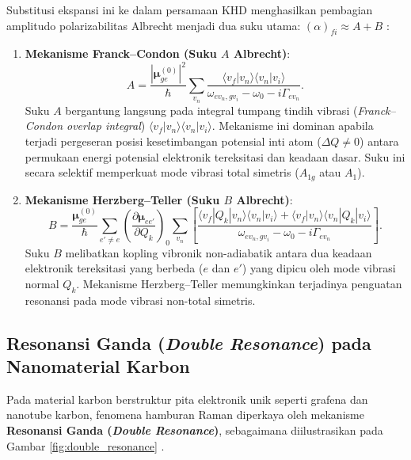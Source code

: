 Substitusi ekspansi ini ke dalam persamaan KHD menghasilkan pembagian amplitudo polarizabilitas Albrecht menjadi dua suku utama: $(\alpha)_{fi} \approx A + B$ \cite{albrecht1961theory}:
\begin{enumerate}
    \item \textbf{Mekanisme Franck--Condon (Suku $A$ Albrecht)}:
    \begin{equation}
    A = \frac{|\boldsymbol{\mu}_{ge}^{(0)}|^2}{\hbar} \sum_{v_n} \frac{\langle v_f | v_n \rangle \langle v_n | v_i \rangle}{\omega_{ev_n, gv_i} - \omega_0 - i\Gamma_{ev_n}}.
    \label{eq:albrecht_a}
    \end{equation}
    Suku $A$ bergantung langsung pada integral tumpang tindih vibrasi (\textit{Franck--Condon overlap integral}) $\langle v_f | v_n \rangle \langle v_n | v_i \rangle$. Mekanisme ini dominan apabila terjadi pergeseran posisi kesetimbangan potensial inti atom ($\Delta Q \neq 0$) antara permukaan energi potensial elektronik tereksitasi dan keadaan dasar. Suku ini secara selektif memperkuat mode vibrasi total simetris ($A_{1g}$ atau $A_1$).
    \item \textbf{Mekanisme Herzberg--Teller (Suku $B$ Albrecht)}:
    \begin{equation}
    B = \frac{\boldsymbol{\mu}_{ge}^{(0)}}{\hbar} \sum_{e' \neq e} \left( \frac{\partial \boldsymbol{\mu}_{ee'}}{\partial Q_k} \right)_0 \sum_{v_n} \left[ \frac{\langle v_f | Q_k | v_n \rangle \langle v_n | v_i \rangle + \langle v_f | v_n \rangle \langle v_n | Q_k | v_i \rangle}{\omega_{ev_n, gv_i} - \omega_0 - i\Gamma_{ev_n}} \right].
    \label{eq:albrecht_b}
    \end{equation}
    Suku $B$ melibatkan kopling vibronik non-adiabatik antara dua keadaan elektronik tereksitasi yang berbeda ($e$ dan $e'$) yang dipicu oleh mode vibrasi normal $Q_k$. Mekanisme Herzberg--Teller memungkinkan terjadinya penguatan resonansi pada mode vibrasi non-total simetris.
\end{enumerate}

\subsection{Resonansi Ganda (\textit{Double Resonance}) pada Nanomaterial Karbon}
Pada material karbon berstruktur pita elektronik unik seperti grafena dan nanotube karbon, fenomena hamburan Raman diperkaya oleh mekanisme \textbf{Resonansi Ganda (\textit{Double Resonance})}, sebagaimana diilustrasikan pada Gambar \ref{fig:double_resonance} \cite{ferrari2006raman,malard2009raman}.

